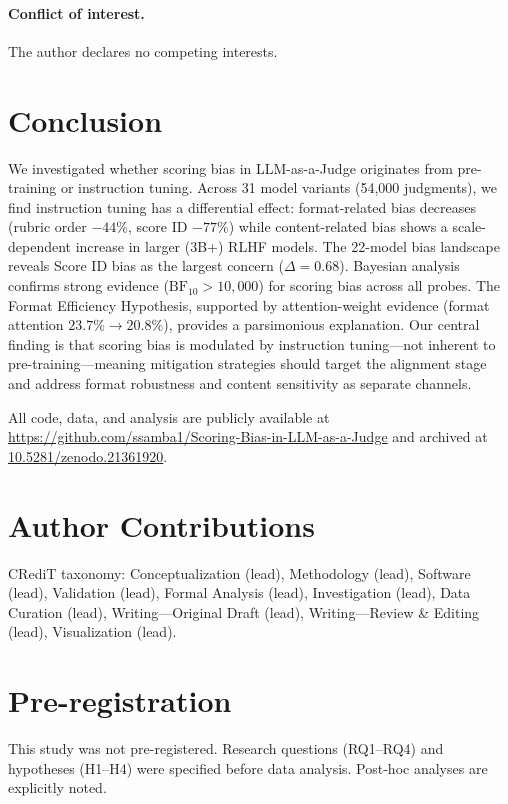 \documentclass[11pt,twocolumn]{article}
\begin{document}
\paragraph{Conflict of interest.}
The author declares no competing interests.

\section{Conclusion}

We investigated whether scoring bias in LLM-as-a-Judge originates from pre-training or instruction tuning. Across 31 model variants (54,000 judgments), we find instruction tuning has a differential effect: format-related bias decreases (rubric order $-44\%$, score ID $-77\%$) while content-related bias shows a scale-dependent increase in larger (3B+) RLHF models. The 22-model bias landscape reveals Score ID bias as the largest concern ($\Delta=0.68$). Bayesian analysis confirms strong evidence ($\text{BF}_{10} > 10{,}000$) for scoring bias across all probes. The Format Efficiency Hypothesis, supported by attention-weight evidence (format attention $23.7\% \to 20.8\%$), provides a parsimonious explanation. Our central finding is that scoring bias is modulated by instruction tuning---not inherent to pre-training---meaning mitigation strategies should target the alignment stage and address format robustness and content sensitivity as separate channels.

All code, data, and analysis are publicly available at \url{https://github.com/ssamba1/Scoring-Bias-in-LLM-as-a-Judge} and archived at \href{https://doi.org/10.5281/zenodo.21361920}{10.5281/zenodo.21361920}.

\section*{Author Contributions}
CRediT taxonomy: Conceptualization (lead), Methodology (lead), Software (lead), Validation (lead), Formal Analysis (lead), Investigation (lead), Data Curation (lead), Writing---Original Draft (lead), Writing---Review \& Editing (lead), Visualization (lead).

\section*{Pre-registration}
This study was not pre-registered. Research questions (RQ1--RQ4) and hypotheses (H1--H4) were specified before data analysis. Post-hoc analyses are explicitly noted.
\end{document}
